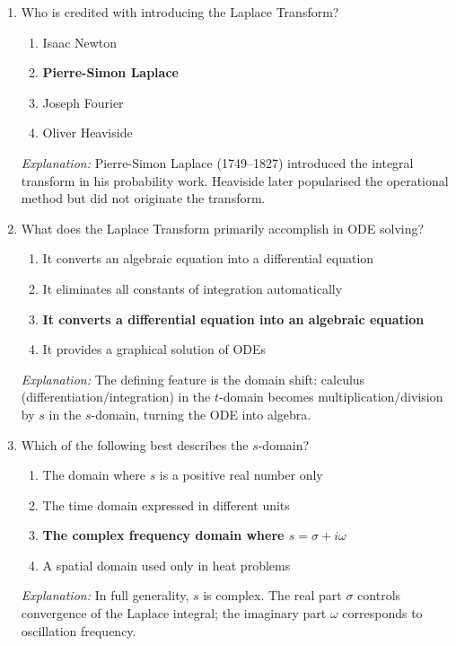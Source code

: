 \documentclass[12pt,a4paper]{article}
\begin{document}
\begin{enumerate}[label=\textbf{MCQ \arabic*.}, leftmargin=*, itemsep=10pt]

  \item Who is credited with introducing the Laplace Transform?
        \begin{enumerate}[label=(\alph*)]
          \item Isaac Newton
          \item \textbf{Pierre-Simon Laplace}
          \item Joseph Fourier
          \item Oliver Heaviside
        \end{enumerate}
        \textit{Explanation:} Pierre-Simon Laplace (1749--1827) introduced the
        integral transform in his probability work.  Heaviside later
        popularised the operational method but did not originate the transform.

  \item What does the Laplace Transform primarily accomplish in ODE solving?
        \begin{enumerate}[label=(\alph*)]
          \item It converts an algebraic equation into a differential equation
          \item It eliminates all constants of integration automatically
          \item \textbf{It converts a differential equation into an algebraic equation}
          \item It provides a graphical solution of ODEs
        \end{enumerate}
        \textit{Explanation:} The defining feature is the domain shift:
        calculus (differentiation/integration) in the $t$-domain becomes
        multiplication/division by $s$ in the $s$-domain, turning the ODE
        into algebra.

  \item Which of the following best describes the $s$-domain?
        \begin{enumerate}[label=(\alph*)]
          \item The domain where $s$ is a positive real number only
          \item The time domain expressed in different units
          \item \textbf{The complex frequency domain where $s = \sigma + i\omega$}
          \item A spatial domain used only in heat problems
        \end{enumerate}
        \textit{Explanation:} In full generality, $s$ is complex.  The real
        part $\sigma$ controls convergence of the Laplace integral; the
        imaginary part $\omega$ corresponds to oscillation frequency.


\end{enumerate}
\end{document}
